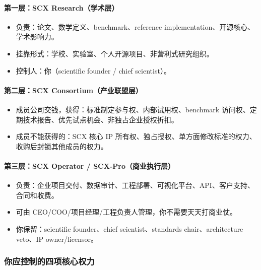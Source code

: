 \documentclass[
  12pt,
]{ctexart}
\providecommand{\tightlist}{%
  \setlength{\itemsep}{0pt}\setlength{\parskip}{0pt}}
\begin{document}
\paragraph{第一层：SCX
Research（学术层）}\label{ux7b2cux4e00ux5c42scx-researchux5b66ux672fux5c42}

\begin{itemize}
\tightlist
\item
  负责：论文、数学定义、benchmark、reference
  implementation、开源核心、学术影响力。
\item
  挂靠形式：学校、实验室、个人开源项目、非营利式研究组织。
\item
  控制人：你（scientific founder / chief scientist）。
\end{itemize}

\paragraph{第二层：SCX
Consortium（产业联盟层）}\label{ux7b2cux4e8cux5c42scx-consortiumux4ea7ux4e1aux8054ux76dfux5c42}

\begin{itemize}
\tightlist
\item
  成员公司交钱，获得：标准制定参与权、内部试用权、benchmark
  访问权、定期技术报告、优先试点机会、非独占企业授权折扣。
\item
  成员不能获得的：SCX 核心 IP
  所有权、独占授权、单方面修改标准的权力、收购后封锁其他成员的权力。
\end{itemize}

\paragraph{第三层：SCX Operator /
SCX-Pro（商业执行层）}\label{ux7b2cux4e09ux5c42scx-operator-scx-proux5546ux4e1aux6267ux884cux5c42}

\begin{itemize}
\tightlist
\item
  负责：企业项目交付、数据审计、工程部署、可视化平台、API、客户支持、合同和收费。
\item
  可由 CEO/COO/项目经理/工程负责人管理，你不需要天天打商业仗。
\item
  你保留：scientific founder、chief scientist、standards
  chair、architecture veto、IP owner/licensor。
\end{itemize}

\subsubsection{你应控制的四项核心权力}\label{ux4f60ux5e94ux63a7ux5236ux7684ux56dbux9879ux6838ux5fc3ux6743ux529b}
\end{document}
